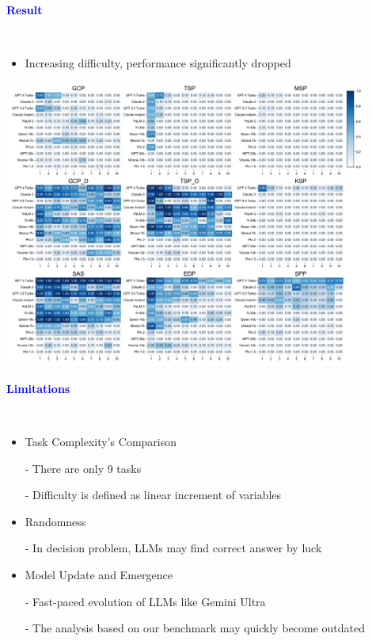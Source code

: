 \documentclass[professionalfont]{beamer}
\begin{document}
\begin{frame}
\begin{center}
    { \textbf{\textcolor{blue}{ {\fontsize{12}{14}\selectfont Result} }} }
\end{center}
\\[0.1cm]

{\fontsize{10}{14}\selectfont 
\begin{itemize}
    \item Increasing difficulty, performance significantly dropped
\end{itemize}
}

\begin{center}
    \includegraphics[width=0.9\textwidth]{figure2.png}
\end{center}

\end{frame}

\begin{frame}
\begin{center}
    { \textbf{\textcolor{blue}{ {\fontsize{12}{14}\selectfont Limitations} }} }
\end{center}
\\[0.5cm]

{\fontsize{10}{14}\selectfont 
\begin{itemize}
    \item Task Complexity’s Comparison

    - There are only 9 tasks

    - Difficulty is defined as linear increment of variables

    \item Randomness

    - In decision problem, LLMs may find correct answer by luck

    \item Model Update and Emergence

    - Fast-paced evolution of LLMs like Gemini Ultra

    - The analysis based on our benchmark may quickly become outdated
\end{itemize}
}

\end{frame}
\end{document}
